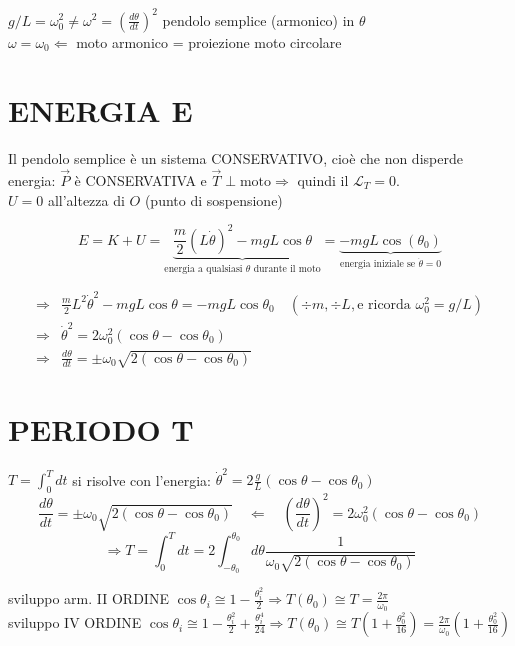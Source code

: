 \documentclass[12pt]{article}
\begin{document}
\noindent * $g/L = \omega_0^2 \neq \omega^2 = \left(\frac{d\theta}{dt}\right)^2$ pendolo semplice (armonico) in $\theta$ \\
$\omega = \omega_0 \Leftarrow$ moto armonico = proiezione moto circolare

\section*{ENERGIA E}
Il pendolo semplice è un sistema CONSERVATIVO, cioè che non disperde energia: $\vec{P}$ è CONSERVATIVA e $\vec{T} \perp \text{moto} \Rightarrow$ quindi il $\mathcal{L}_T = 0$. \\
$U = 0$ all'altezza di $O$ (punto di sospensione)

$$ E = K + U = \underbrace{\frac{m}{2} (L\dot{\theta})^2 - mgL\cos\theta}_{\text{energia a qualsiasi } \theta \text{ durante il moto}} = \underbrace{-mgL\cos(\theta_0)}_{\text{energia iniziale se } \dot{\theta}=0} $$

\begin{align*}
\Rightarrow & \frac{m}{2}L^2\dot{\theta}^2 - mgL\cos\theta = -mgL\cos\theta_0 \quad (\div m, \div L, \text{e ricorda } \omega_0^2 = g/L) \\
\Rightarrow & \dot{\theta}^2 = 2\omega_0^2(\cos\theta - \cos\theta_0) \\
\Rightarrow & \frac{d\theta}{dt} = \pm \omega_0 \sqrt{2(\cos\theta - \cos\theta_0)}
\end{align*}

\section*{PERIODO T}
$T = \int_0^T dt$ si risolve con l'energia: $\dot{\theta}^2 = 2\frac{g}{L}(\cos\theta - \cos\theta_0)$
$$ \frac{d\theta}{dt} = \pm \omega_0 \sqrt{2(\cos\theta - \cos\theta_0)} \quad \Leftarrow \quad \left(\frac{d\theta}{dt}\right)^2 = 2\omega_0^2(\cos\theta - \cos\theta_0) $$
$$ \Rightarrow T = \int_0^T dt = 2 \int_{-\theta_0}^{\theta_0} d\theta \frac{1}{\omega_0\sqrt{2(\cos\theta - \cos\theta_0)}} $$

\vspace{0.3cm}
\noindent sviluppo arm. II ORDINE $\cos\theta_i \cong 1 - \frac{\theta_i^2}{2} \Rightarrow T(\theta_0) \cong T = \frac{2\pi}{\omega_0}$ \\[0.2cm]
sviluppo IV ORDINE $\cos\theta_i \cong 1 - \frac{\theta_i^2}{2} + \frac{\theta_i^4}{24} \Rightarrow T(\theta_0) \cong T\left(1 + \frac{\theta_0^2}{16}\right) = \frac{2\pi}{\omega_0}\left(1 + \frac{\theta_0^2}{16}\right)$
\end{document}
